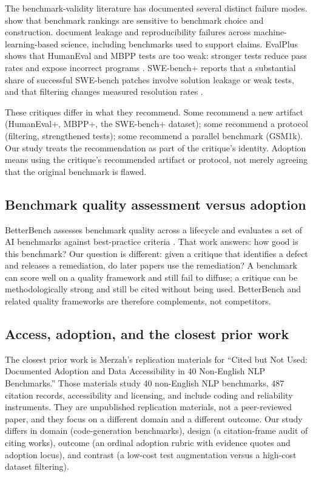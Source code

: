 \documentclass[11pt,a4paper]{article}
\begin{document}
The benchmark-validity literature has documented several distinct failure modes. \citet{dehghani2021} show that benchmark rankings are sensitive to benchmark choice and construction. \citet{kapoor2023} document leakage and reproducibility failures across machine-learning-based science, including benchmarks used to support claims. EvalPlus shows that HumanEval and MBPP tests are too weak: stronger tests reduce pass rates and expose incorrect programs \citep{liu2023}. SWE-bench+ reports that a substantial share of successful SWE-bench patches involve solution leakage or weak tests, and that filtering changes measured resolution rates \citep{aleithan2024}.

These critiques differ in what they recommend. Some recommend a new artifact (HumanEval+, MBPP+, the SWE-bench+ dataset); some recommend a protocol (filtering, strengthened tests); some recommend a parallel benchmark (GSM1k). Our study treats the recommendation as part of the critique's identity. Adoption means using the critique's recommended artifact or protocol, not merely agreeing that the original benchmark is flawed.

\subsection{Benchmark quality assessment versus adoption}

BetterBench assesses benchmark quality across a lifecycle and evaluates a set of AI benchmarks against best-practice criteria \citep{reuel2024}. That work answers: how good is this benchmark? Our question is different: given a critique that identifies a defect and releases a remediation, do later papers use the remediation? A benchmark can score well on a quality framework and still fail to diffuse; a critique can be methodologically strong and still be cited without being used. BetterBench and related quality frameworks are therefore complements, not competitors.

\subsection{Access, adoption, and the closest prior work}

The closest prior work is Merzah's \citeyearpar{merzah2026} replication materials for ``Cited but Not Used: Documented Adoption and Data Accessibility in 40 Non-English NLP Benchmarks.'' Those materials study 40 non-English NLP benchmarks, 487 citation records, accessibility and licensing, and include coding and reliability instruments. They are unpublished replication materials, not a peer-reviewed paper, and they focus on a different domain and a different outcome. Our study differs in domain (code-generation benchmarks), design (a citation-frame audit of citing works), outcome (an ordinal adoption rubric with evidence quotes and adoption locus), and contrast (a low-cost test augmentation versus a high-cost dataset filtering).
\end{document}
